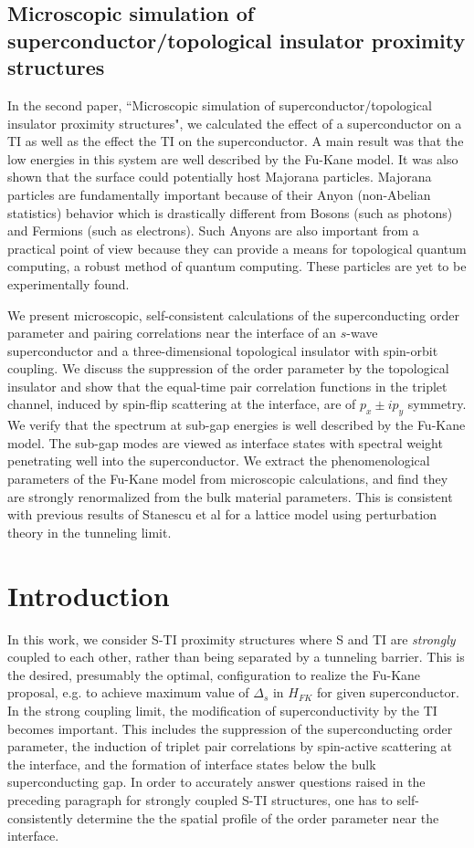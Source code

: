 \documentclass[12pt,twocolumn]{article}
\begin{document}
\subsection*{Microscopic simulation of superconductor/topological insulator proximity structures}
In the second paper, ``Microscopic simulation of superconductor/topological insulator proximity structures", we calculated the effect of a superconductor on a TI as well as the effect the TI on the superconductor. A main result was that the low energies in this system are well described by the Fu-Kane model. It was also shown that the surface could potentially host Majorana particles. Majorana particles are fundamentally important because of their Anyon (non-Abelian statistics) behavior which is drastically different from Bosons (such as photons) and Fermions (such as electrons). Such Anyons are also important from a practical point of view because they can provide a means for topological quantum computing, a robust method of quantum computing. These particles are yet to be experimentally found.


We present microscopic, self-consistent calculations of the 
superconducting order parameter and pairing correlations near the 
interface of an $s$-wave superconductor and
a three-dimensional topological insulator with spin-orbit coupling.
%
We discuss the suppression of the order parameter by the topological 
insulator and show that the equal-time pair correlation functions
in the triplet channel, induced by spin-flip scattering at the interface, 
are of $p_x\pm i p_y$ symmetry.
%
We verify that the spectrum at sub-gap energies is well described by
the Fu-Kane model. The sub-gap modes are viewed as interface states with
spectral weight penetrating well into the superconductor. 
We extract the phenomenological 
parameters of the Fu-Kane model from microscopic calculations, and find they
are strongly renormalized from the bulk material parameters. This is consistent 
with previous results of Stanescu et al for a lattice model using perturbation
theory in the tunneling limit.
\section{Introduction}

In this work, we consider S-TI proximity structures where 
S and TI are {\it strongly} coupled to each other, 
rather than being separated by a tunneling barrier.
This is the desired, presumably the optimal, configuration to realize the Fu-Kane
proposal, e.g. to achieve maximum value of $\Delta_s$ in $H_{FK}$ for given
superconductor. 
In the strong coupling limit, 
the modification of superconductivity by the TI becomes important.
This includes the suppression of the superconducting order parameter,
the induction of triplet pair correlations by spin-active scattering
at the interface, and the formation of interface states below the bulk superconducting gap.
In order to accurately answer questions raised in the preceding paragraph
for strongly coupled S-TI structures, one has to self-consistently 
determine the the spatial profile of 
the order parameter near the interface.
\end{document}
